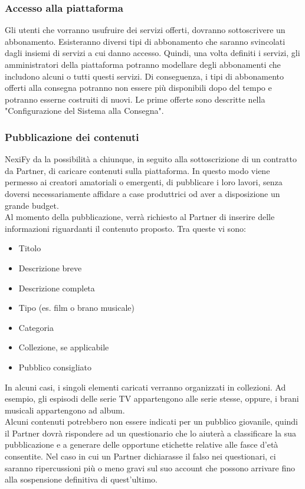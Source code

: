 \subsubsection{Accesso alla piattaforma}
Gli utenti che vorranno usufruire dei servizi offerti, dovranno sottoscrivere un abbonamento. Esisteranno diversi
tipi di abbonamento che saranno svincolati dagli insiemi di servizi a cui danno accesso. Quindi, una volta definiti
i servizi, gli amministratori della piattaforma potranno modellare degli abbonamenti che includono alcuni o
tutti questi servizi. Di conseguenza, i tipi di abbonamento offerti alla consegna potranno non essere più
disponibili dopo del tempo e potranno esserne costruiti di nuovi.
Le prime offerte sono descritte nella "Configurazione del Sistema alla Consegna".

\subsubsection{Pubblicazione dei contenuti}
NexiFy da la possibilità a chiunque, in seguito alla sottoscrizione di un contratto da Partner,
di caricare contenuti sulla piattaforma. In questo modo viene permesso ai creatori amatoriali o emergenti,
di pubblicare i loro lavori, senza doversi necessariamente affidare a case produttrici od aver a disposizione
un grande budget.\\
Al momento della pubblicazione, verrà richiesto al Partner di inserire delle informazioni riguardanti
il contenuto proposto. Tra queste vi sono:
\begin{itemize}
    \item Titolo 
    \item Descrizione breve
    \item Descrizione completa
    \item Tipo (es. film o brano musicale)
    \item Categoria
    \item Collezione, se applicabile
    \item Pubblico consigliato
\end{itemize}
In alcuni casi, i singoli elementi caricati verranno organizzati in collezioni. Ad esempio, gli espisodi delle
serie TV appartengono alle serie stesse, oppure, i brani musicali appartengono ad album.\\
Alcuni contenuti potrebbero non essere indicati per un pubblico giovanile, quindi il Partner dovrà rispondere ad
un questionario che lo aiuterà a classificare la sua pubblicazione e a generare delle opportune etichette
relative alle fasce d'età consentite. Nel caso in cui un Partner dichiarasse il falso nei questionari, ci 
saranno ripercussioni più o meno gravi sul suo account che possono arrivare fino alla sospensione definitiva
di quest'ultimo.
